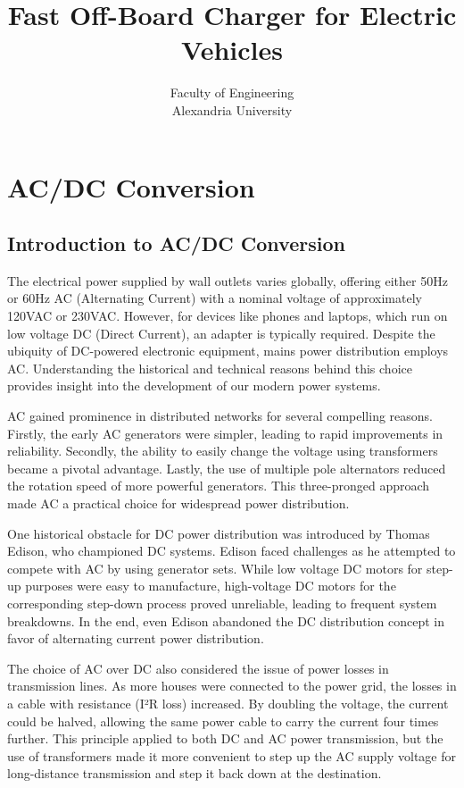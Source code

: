 \documentclass[12pt,a4paper]{book}
\author{Faculty of Engineering \\Alexandria University}
\title{Fast Off-Board Charger for Electric Vehicles}
\date{}
\begin{document}
\maketitle
\setcounter{tocdepth}{3}
\tableofcontents
\listoffigures
\listoftables

\part{AC/DC Conversion}

\chapter{Introduction to AC/DC Conversion}
The electrical power supplied by wall outlets varies globally, offering either 50Hz or 60Hz AC (Alternating Current) with a nominal voltage of approximately 120VAC or 230VAC. However, for devices like phones and laptops, which run on low voltage DC (Direct Current), an adapter is typically required. Despite the ubiquity of DC-powered electronic equipment, mains power distribution employs AC. Understanding the historical and technical reasons behind this choice provides insight into the development of our modern power systems.

AC gained prominence in distributed networks for several compelling reasons. Firstly, the early AC generators were simpler, leading to rapid improvements in reliability. Secondly, the ability to easily change the voltage using transformers became a pivotal advantage. Lastly, the use of multiple pole alternators reduced the rotation speed of more powerful generators. This three-pronged approach made AC a practical choice for widespread power distribution.

One historical obstacle for DC power distribution was introduced by Thomas Edison, who championed DC systems. Edison faced challenges as he attempted to compete with AC by using generator sets. While low voltage DC motors for step-up purposes were easy to manufacture, high-voltage DC motors for the corresponding step-down process proved unreliable, leading to frequent system breakdowns. In the end, even Edison abandoned the DC distribution concept in favor of alternating current power distribution\cite{acdc2018}.

The choice of AC over DC also considered the issue of power losses in transmission lines. As more houses were connected to the power grid, the losses in a cable with resistance (I²R loss) increased. By doubling the voltage, the current could be halved, allowing the same power cable to carry the current four times further. This principle applied to both DC and AC power transmission, but the use of transformers made it more convenient to step up the AC supply voltage for long-distance transmission and step it back down at the destination.
\end{document}
